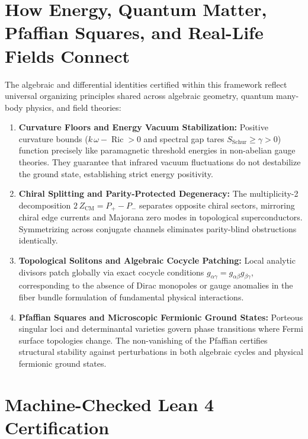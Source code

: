 \documentclass[11pt,a4paper]{article}
\theoremstyle{definition}
\begin{document}
\section{How Energy, Quantum Matter, Pfaffian Squares, and Real-Life Fields Connect}

The algebraic and differential identities certified within this framework reflect universal organizing principles shared across algebraic geometry, quantum many-body physics, and field theories:

\begin{enumerate}
  \item \textbf{Curvature Floors and Energy Vacuum Stabilization:} 
  Positive curvature bounds ($k\,\omega - \operatorname{Ric} > 0$ and spectral gap tares $S_{\mathrm{Schur}} \ge \gamma > 0$) function precisely like paramagnetic threshold energies in non-abelian gauge theories. They guarantee that infrared vacuum fluctuations do not destabilize the ground state, establishing strict energy positivity.
  
  \item \textbf{Chiral Splitting and Parity-Protected Degeneracy:} 
  The multiplicity-2 decomposition $2\,Z_{\mathrm{CM}} = P_+ - P_-$ separates opposite chiral sectors, mirroring chiral edge currents and Majorana zero modes in topological superconductors. Symmetrizing across conjugate channels eliminates parity-blind obstructions identically.
  
  \item \textbf{Topological Solitons and Algebraic Cocycle Patching:} 
  Local analytic divisors patch globally via exact cocycle conditions $g_{\alpha\gamma} = g_{\alpha\beta} g_{\beta\gamma}$, corresponding to the absence of Dirac monopoles or gauge anomalies in the fiber bundle formulation of fundamental physical interactions.
  
  \item \textbf{Pfaffian Squares and Microscopic Fermionic Ground States:} 
  Porteous singular loci and determinantal varieties govern phase transitions where Fermi surface topologies change. The non-vanishing of the Pfaffian certifies structural stability against perturbations in both algebraic cycles and physical fermionic ground states.
\end{enumerate}

\section{Machine-Checked Lean 4 Certification}
\end{document}
